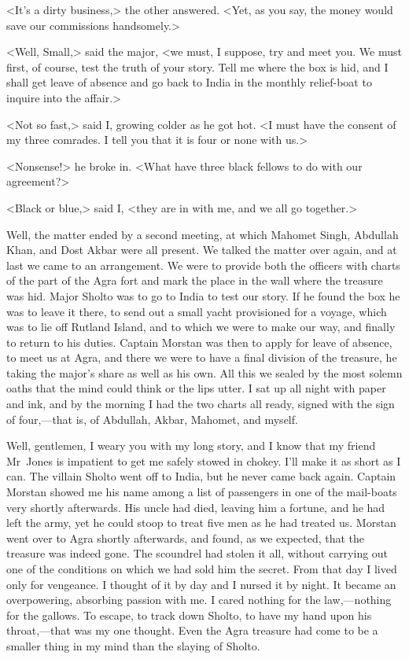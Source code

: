 <It's a dirty business,> the other answered. <Yet, as you say, the money would save our commissions handsomely.>

<Well, Small,> said the major, <we must, I suppose, try and meet you. We must first, of course, test the truth of your story. Tell me where the box is hid, and I shall get leave of absence and go back to India in the monthly relief-boat to inquire into the affair.>

<Not so fast,> said I, growing colder as he got hot. <I must have the consent of my three comrades. I tell you that it is four or none with us.>

<Nonsense!> he broke in. <What have three black fellows to do with our agreement?>

<Black or blue,> said I, <they are in with me, and we all go together.>

Well, the matter ended by a second meeting, at which Mahomet Singh, Abdullah Khan, and Dost Akbar were all present. We talked the matter over again, and at last we came to an arrangement. We were to provide both the officers with charts of the part of the Agra fort and mark the place in the wall where the treasure was hid. Major Sholto was to go to India to test our story. If he found the box he was to leave it there, to send out a small yacht provisioned for a voyage, which was to lie off Rutland Island, and to which we were to make our way, and finally to return to his duties. Captain Morstan was then to apply for leave of absence, to meet us at Agra, and there we were to have a final division of the treasure, he taking the major's share as well as his own. All this we sealed by the most solemn oaths that the mind could think or the lips utter. I sat up all night with paper and ink, and by the morning I had the two charts all ready, signed with the sign of four,—that is, of Abdullah, Akbar, Mahomet, and myself.

Well, gentlemen, I weary you with my long story, and I know that my friend Mr~Jones is impatient to get me safely stowed in chokey. I'll make it as short as I can. The villain Sholto went off to India, but he never came back again. Captain Morstan showed me his name among a list of passengers in one of the mail-boats very shortly afterwards. His uncle had died, leaving him a fortune, and he had left the army, yet he could stoop to treat five men as he had treated us. Morstan went over to Agra shortly afterwards, and found, as we expected, that the treasure was indeed gone. The scoundrel had stolen it all, without carrying out one of the conditions on which we had sold him the secret. From that day I lived only for vengeance. I thought of it by day and I nursed it by night. It became an overpowering, absorbing passion with me. I cared nothing for the law,—nothing for the gallows. To escape, to track down Sholto, to have my hand upon his throat,—that was my one thought. Even the Agra treasure had come to be a smaller thing in my mind than the slaying of Sholto.

